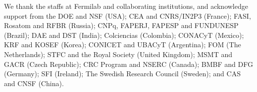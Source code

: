 %
We thank the staffs at Fermilab and collaborating institutions,
and acknowledge support from the
DOE and NSF (USA);
CEA and CNRS/IN2P3 (France);
FASI, Rosatom and RFBR (Russia);
CNPq, FAPERJ, FAPESP and FUNDUNESP (Brazil);
DAE and DST (India);
Colciencias (Colombia);
CONACyT (Mexico);
KRF and KOSEF (Korea);
CONICET and UBACyT (Argentina);
FOM (The Netherlands);
STFC and the Royal Society (United Kingdom);
MSMT and GACR (Czech Republic);
CRC Program and NSERC (Canada);
BMBF and DFG (Germany);
SFI (Ireland);
The Swedish Research Council (Sweden);
and
CAS and CNSF (China).
%
